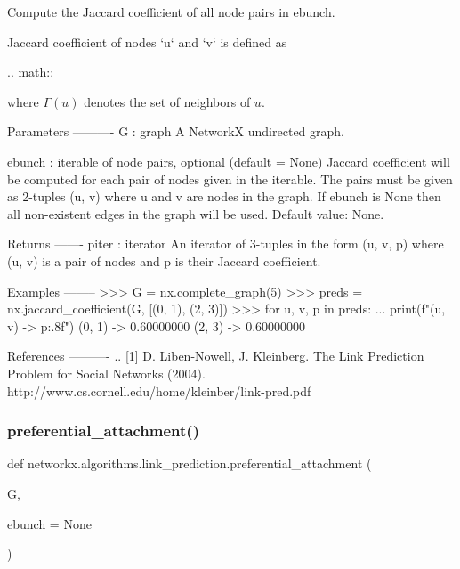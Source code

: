 \begin{DoxyVerb}Compute the Jaccard coefficient of all node pairs in ebunch.

Jaccard coefficient of nodes `u` and `v` is defined as

.. math::


where $\Gamma(u)$ denotes the set of neighbors of $u$.

Parameters
----------
G : graph
    A NetworkX undirected graph.

ebunch : iterable of node pairs, optional (default = None)
    Jaccard coefficient will be computed for each pair of nodes
    given in the iterable. The pairs must be given as 2-tuples
    (u, v) where u and v are nodes in the graph. If ebunch is None
    then all non-existent edges in the graph will be used.
    Default value: None.

Returns
-------
piter : iterator
    An iterator of 3-tuples in the form (u, v, p) where (u, v) is a
    pair of nodes and p is their Jaccard coefficient.

Examples
--------
>>> G = nx.complete_graph(5)
>>> preds = nx.jaccard_coefficient(G, [(0, 1), (2, 3)])
>>> for u, v, p in preds:
...     print(f"({u}, {v}) -> {p:.8f}")
(0, 1) -> 0.60000000
(2, 3) -> 0.60000000

References
----------
.. [1] D. Liben-Nowell, J. Kleinberg.
       The Link Prediction Problem for Social Networks (2004).
       http://www.cs.cornell.edu/home/kleinber/link-pred.pdf
\end{DoxyVerb}
 \mbox{\label{namespacenetworkx_1_1algorithms_1_1link__prediction_a424e20c04c0309c9486da83a51138d05}} 
\subsubsection{\texorpdfstring{preferential\+\_\+attachment()}{preferential\_attachment()}}
{\footnotesize\ttfamily def networkx.\+algorithms.\+link\+\_\+prediction.\+preferential\+\_\+attachment (\begin{DoxyParamCaption}\item[{}]{G,  }\item[{}]{ebunch = {\ttfamily None} }\end{DoxyParamCaption})}

